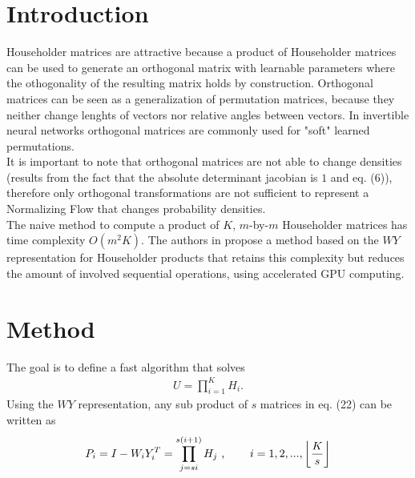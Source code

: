 \documentclass{article}
\DeclarePairedDelimiter\floor{\lfloor}{\rfloor}
\begin{document}
\section{Introduction}
Householder matrices are attractive because a product of Householder matrices can be used to generate an orthogonal matrix with learnable parameters where the othogonality of the resulting matrix holds by construction. Orthogonal matrices can be seen as a generalization of permutation matrices, because they neither change lenghts of vectors nor relative angles between vectors. In invertible neural networks orthogonal matrices are commonly used for "soft" learned permutations.\\
It is important to note that orthogonal matrices are not able to change densities (results from the fact that the absolute determinant jacobian is $1$ and eq. (6)), therefore only orthogonal transformations are not sufficient to represent a Normalizing Flow that changes probability densities.\\
The naive method to compute a product of $K$, $m$-by-$m$ Householder matrices has time complexity $O(m^2K)$. The authors in \cite{fast_hm} propose a method based on the $WY$ representation for Householder products that retains this complexity but reduces the amount of involved sequential operations, using accelerated GPU computing.


\section{Method}\label{sec:meth}
The goal is to define a fast algorithm that solves 
\begin{align}
	U = \prod_{i=1}^KH_i .
\end{align}
Using the $WY$ representation, any sub product of $s$ matrices in eq. (22) can be written as
\begin{align}
	P_i = I - W_iY_i^T = \prod_{j=si}^{s(i+1)}H_j \text{ ,\hspace{8mm}} i=1, 2, ..., \floor*{\frac{K}{s}}
\end{align}
\end{document}
